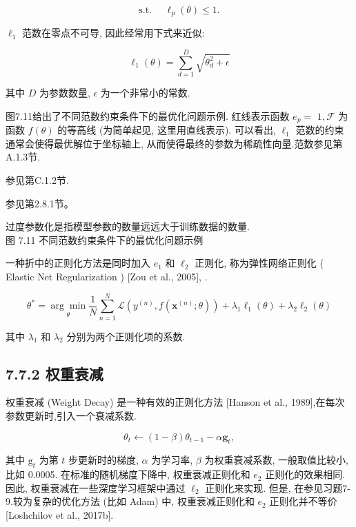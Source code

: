 \documentclass[10pt]{article}
\begin{document}
\begin{equation*}
\text { s.t. } \quad \ell_{p}(\theta) \leq 1 \text {. } \tag{7.70}
\end{equation*}


$\ell_{1}$ 范数在零点不可导, 因此经常用下式来近似:


\begin{equation*}
\ell_{1}(\theta)=\sum_{d=1}^{D} \sqrt{\theta_{d}^{2}+\epsilon} \tag{7.71}
\end{equation*}


其中 $D$ 为参数数量, $\epsilon$ 为一个非常小的常数.

图7.11给出了不同范数约束条件下的最优化问题示例. 红线表示函数 $e_{p}=$ $1, \mathcal{F}$ 为函数 $f(\theta)$ 的等高线 (为简单起见, 这里用直线表示). 可以看出, $\ell_{1}$ 范数的约束通常会使得最优解位于坐标轴上, 从而使得最终的参数为稀疏性向量.范数参见第A.1.3节.

参见第C.1.2节.

参见第2.8.1节。

过度参数化是指模型参数的数量远远大于训练数据的数量.\\


图 7.11 不同范数约束条件下的最优化问题示例

一种折中的正则化方法是同时加入 $e_{1}$ 和 $\ell_{2}$ 正则化, 称为弹性网络正则化 ( Elastic Net Regularization ) [Zou et al., 2005], .


\begin{equation*}
\theta^{*}=\underset{\theta}{\arg \min } \frac{1}{N} \sum_{n=1}^{N} \mathcal{L}\left(y^{(n)}, f\left(\boldsymbol{x}^{(n)} ; \theta\right)\right)+\lambda_{1} \ell_{1}(\theta)+\lambda_{2} \ell_{2}(\theta) \tag{7.72}
\end{equation*}


其中 $\lambda_{1}$ 和 $\lambda_{2}$ 分别为两个正则化项的系数.

\subsection*{7.7.2 权重衰减}
权重衰减 (Weight Decay) 是一种有效的正则化方法 [Hanson et al., 1989],在每次参数更新时,引入一个衰减系数.


\begin{equation*}
\theta_{t} \leftarrow(1-\beta) \theta_{t-1}-\alpha \mathbf{g}_{t}, \tag{7.73}
\end{equation*}


其中 $\mathrm{g}_{t}$ 为第 $t$ 步更新时的梯度, $\alpha$ 为学习率, $\beta$ 为权重衰减系数, 一般取值比较小, 比如 0.0005. 在标准的随机梯度下降中, 权重衰减正则化和 $e_{2}$ 正则化的效果相同. 因此, 权重衰减在一些深度学习框架中通过 $\ell_{2}$ 正则化来实现. 但是, 在参见习题7-9.较为复杂的优化方法 (比如 Adam) 中, 权重衰减正则化和 $e_{2}$ 正则化并不等价 [Loshchilov et al., 2017b].
\end{document}
